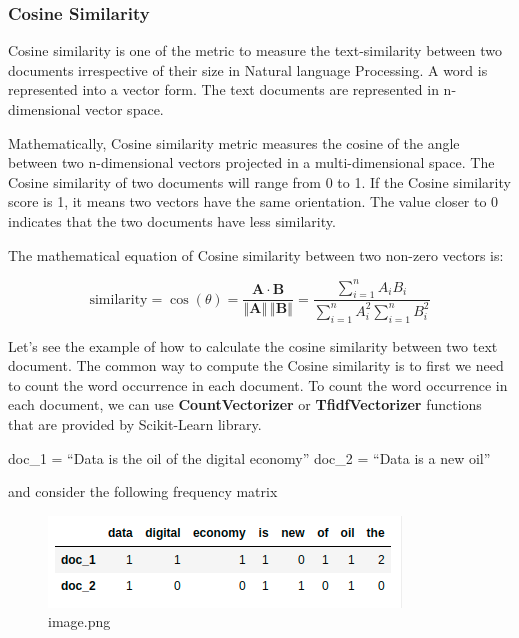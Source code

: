 \documentclass[11pt]{article}
\begin{document}
    \hypertarget{cosine-similarity}{%
\subsubsection{Cosine Similarity}\label{cosine-similarity}}

    Cosine similarity is one of the metric to measure the text-similarity
between two documents irrespective of their size in Natural language
Processing. A word is represented into a vector form. The text documents
are represented in n-dimensional vector space.

Mathematically, Cosine similarity metric measures the cosine of the
angle between two n-dimensional vectors projected in a multi-dimensional
space. The Cosine similarity of two documents will range from 0 to 1. If
the Cosine similarity score is 1, it means two vectors have the same
orientation. The value closer to 0 indicates that the two documents have
less similarity.

The mathematical equation of Cosine similarity between two non-zero
vectors is:

\begin{equation}
\text{similarity} = \cos(\theta) = \frac{\mathbf{A} \cdot \mathbf{B}}{\left\Vert\mathbf{A}\right\Vert \,\left\Vert\mathbf{B}\right\Vert} = \frac{\sum\limits_{i=1}^n A_iB_i}{\sum\limits_{i=1}^n A_i^2 \sum\limits_{i=1}^n B_i^2}
\end{equation}

Let's see the example of how to calculate the cosine similarity between
two text document. The common way to compute the Cosine similarity is to
first we need to count the word occurrence in each document. To count
the word occurrence in each document, we can use
\textbf{CountVectorizer} or \textbf{TfidfVectorizer} functions that are
provided by Scikit-Learn library.

doc\_1 = ``Data is the oil of the digital economy'' doc\_2 = ``Data is a
new oil''

and consider the following frequency matrix

    \begin{figure}
\centering
\includegraphics{./img/tf-idf-2.png}
\caption{image.png}
\end{figure}
\end{document}
